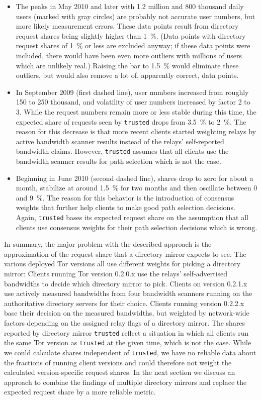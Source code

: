 \documentclass{article}
\begin{document}
\begin{itemize}
\item The peaks in May 2010 and later with 1.2 million and 800
thousand daily users (marked with gray circles) are probably not accurate user
numbers, but more likely measurement errors.
These data points result from directory request shares being slightly
higher than 1~\%.
(Data points with directory request shares of 1~\% or less are excluded
anyway; if these data points were included, there would have been even
more outliers with millions of users which are unlikely real.)
Raising the bar to 1.5~\% would eliminate these outliers, but would also
remove a lot of, apparently correct, data points.
\item In September 2009 (first dashed line), user numbers increased from
roughly 150 to 250 thousand, and volatility of user numbers increased by
factor 2 to 3.
While the request numbers remain more or less stable during this time,
the expected share of requests seen by \texttt{trusted} drops from 3.5~\%
to 2~\%.
The reason for this decrease is that more recent clients started weighting
relays by active bandwidth scanner results instead of the relays'
self-reported bandwidth claims.
However, \texttt{trusted} assumes that all clients use the bandwidth
scanner results for path selection which is not the case.
\item Beginning in June 2010 (second dashed line), shares drop to zero for
about a month, stabilize at around 1.5~\% for two months and then
oscillate between 0 and 9~\%.
The reason for this behavior is the introduction of consensus weights that further help
clients to make good path selection decisions.
Again, \texttt{trusted} bases its expected request share on the
assumption that all clients use consensus weights for their path selection
decisions which is wrong.
\end{itemize}

In summary, the major problem with the described approach is the
approximation of the request share that a directory mirror expects to see.
The various deployed Tor versions all use different weights for picking a
directory mirror:
Clients running Tor version 0.2.0.x use the relays' self-advertised
bandwidths to decide which directory mirror to pick.
Clients on version 0.2.1.x use actively measured bandwidths from four
bandwidth scanners running on the authoritative directory servers for
their choice.
Clients running version 0.2.2.x base their decision on the measured
bandwidths, but weighted by network-wide factors depending on the assigned
relay flags of a directory mirror.
The shares reported by directory mirror \texttt{trusted} reflect a
situation in which all clients run the same Tor version as
\texttt{trusted} at the given time, which is not the case.
While we could calculate shares independent of \texttt{trusted}, we have
no reliable data about the fractions of running client versions and could
therefore not weight the calculated version-specific request shares.
In the next section we discuss an approach to combine the findings of
multiple directory mirrors and replace the expected request share by a
more reliable metric.
\end{document}

